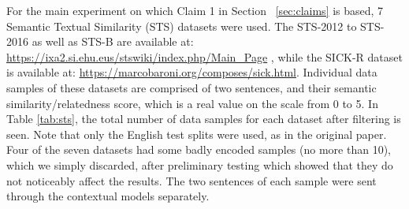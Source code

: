 For the main experiment on which Claim 1 in Section ~\ref{sec:claims} is based, 7 Semantic Textual Similarity (STS) datasets were used. The STS-2012 to STS-2016 \cite{sts2012,sts2013,sts2014,sts2015,sts2016} as well as STS-B are available at: \url{https://ixa2.si.ehu.eus/stswiki/index.php/Main_Page} , while the SICK-R \cite{sickr} dataset is available at: \url{https://marcobaroni.org/composes/sick.html}. Individual data samples of these datasets are comprised of two sentences, and their semantic similarity/relatedness score, which is a real value on the scale from 0 to 5. In Table \ref{tab:sts}, the total number of data samples for each dataset after filtering is seen. Note that only the English test splits were used, as in the original paper. Four of the seven datasets had some badly encoded samples (no more than 10), which we simply discarded, after preliminary testing which showed that they do not noticeably affect the results. The two sentences of each sample were sent through the contextual models separately.

